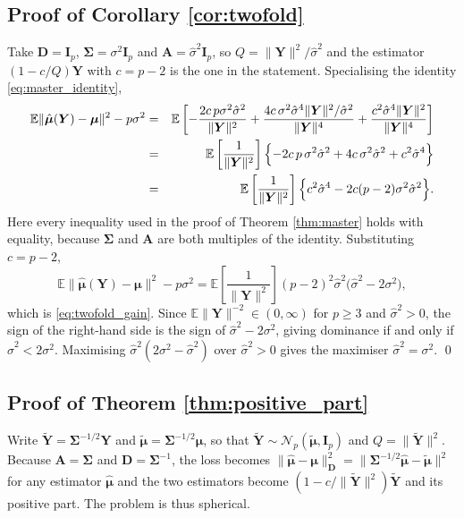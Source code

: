 \documentclass[a4paper,fleqn]{cas-sc}
\theoremstyle{plain}
\theoremstyle{definition}
\theoremstyle{remark}
\newcommand{\E}{\mathbb{E}}
\begin{document}
\begin{appendices}
\subsection*{Proof of Corollary \ref{cor:twofold}}

Take $\bm D=\bm I_p$, $\bm\Sigma=\sigma^2\bm I_p$ and $\bm A=\hat\sigma^2\bm I_p$, so $Q=\|\bm Y\|^2/\hat\sigma^2$ and the estimator $(1-c/Q)\bm Y$ with $c=p-2$ is the one in the statement. Specialising the identity \eqref{eq:master_identity},
\begin{eqnarray}
\E\|\hat{\bm\mu}(\bm Y)-\bm\mu\|^2-p\sigma^2
&=&
\E\left[
-\frac{2c\,p\sigma^2\hat\sigma^2}{\|\bm Y\|^2}
+\frac{4c\,\sigma^2\hat\sigma^{4}\|\bm Y\|^2/\hat\sigma^2}{\|\bm Y\|^{4}}
+\frac{c^{2}\hat\sigma^{4}\|\bm Y\|^2}{\|\bm Y\|^{4}}
\right]
\cr
&=&
\E\left[\frac{1}{\|\bm Y\|^2}\right]
\Bigl\{
-2c\,p\,\sigma^2\hat\sigma^2+4c\,\sigma^2\hat\sigma^2+c^{2}\hat\sigma^{4}
\Bigr\}
\cr
&=&
\E\left[\frac{1}{\|\bm Y\|^2}\right]
\Bigl\{
c^{2}\hat\sigma^{4}-2c(p-2)\sigma^2\hat\sigma^2
\Bigr\}.
\end{eqnarray}
Here every inequality used in the proof of Theorem \ref{thm:master} holds with equality, because $\bm\Sigma$ and $\bm A$ are both multiples of the identity. Substituting $c=p-2$,
\begin{equation}
\E\|\hat{\bm\mu}(\bm Y)-\bm\mu\|^2-p\sigma^2
=
\E\left[\frac{1}{\|\bm Y\|^2}\right]
(p-2)^2\hat\sigma^2\bigl(\hat\sigma^2-2\sigma^2\bigr),
\end{equation}
which is \eqref{eq:twofold_gain}. Since $\E\|\bm Y\|^{-2}\in(0,\infty)$ for $p\ge3$ and $\hat\sigma^2>0$, the sign of the right-hand side is the sign of $\hat\sigma^2-2\sigma^2$, giving dominance if and only if $\hat\sigma^2<2\sigma^2$. Maximising $\hat\sigma^2(2\sigma^2-\hat\sigma^2)$ over $\hat\sigma^2>0$ gives the maximiser $\hat\sigma^2=\sigma^2$. \qed

\subsection*{Proof of Theorem \ref{thm:positive_part}}

Write $\widetilde{\bm Y}=\bm\Sigma^{-1/2}\bm Y$ and $\widetilde{\bm\mu}=\bm\Sigma^{-1/2}\bm\mu$, so that $\widetilde{\bm Y}\sim\mathcal N_p(\widetilde{\bm\mu},\bm I_p)$ and $Q=\|\widetilde{\bm Y}\|^2$. Because $\bm A=\bm\Sigma$ and $\bm D=\bm\Sigma^{-1}$, the loss becomes $\|\hat{\bm\mu}-\bm\mu\|^2_{\bm D}=\|\bm\Sigma^{-1/2}\hat{\bm\mu}-\widetilde{\bm\mu}\|^2$ for any estimator $\hat{\bm\mu}$ and the two estimators become $(1-c/\|\widetilde{\bm Y}\|^2)\widetilde{\bm Y}$ and its positive part. The problem is thus spherical.


\end{appendices}
\end{document}
